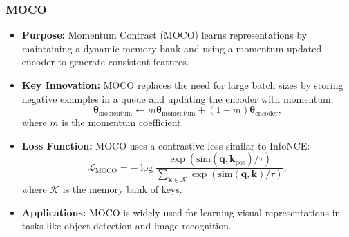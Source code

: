 \documentclass[12pt,a4paper]{article}
\begin{document}
\subsubsection{MOCO}
\begin{itemize}
    \item \textbf{Purpose:} Momentum Contrast (MOCO) learns representations by maintaining a dynamic memory bank and using a momentum-updated encoder to generate consistent features.
    \item \textbf{Key Innovation:} MOCO replaces the need for large batch sizes by storing negative examples in a queue and updating the encoder with momentum:
    \[
    \mathbf{\theta}_\text{momentum} \leftarrow m \mathbf{\theta}_\text{momentum} + (1 - m) \mathbf{\theta}_\text{encoder},
    \]
    where \(m\) is the momentum coefficient.
    \item \textbf{Loss Function:} MOCO uses a contrastive loss similar to InfoNCE:
    \[
    \mathcal{L}_{\text{MOCO}} = -\log \frac{\exp(\text{sim}(\mathbf{q}, \mathbf{k}_\text{pos}) / \tau)}{\sum_{\mathbf{k} \in \mathcal{K}} \exp(\text{sim}(\mathbf{q}, \mathbf{k}) / \tau)},
    \]
    where \(\mathcal{K}\) is the memory bank of keys.
    \item \textbf{Applications:} MOCO is widely used for learning visual representations in tasks like object detection and image recognition.
\end{itemize}
\end{document}
